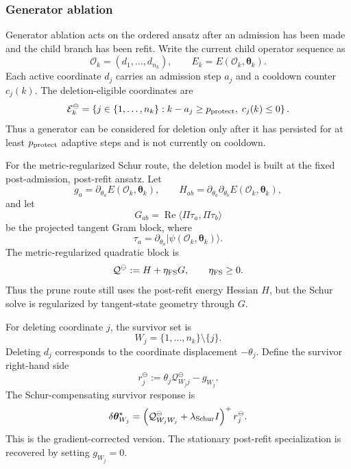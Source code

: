 \documentclass[
  reprint,
  amsmath,
  amssymb,
  aps,
  pra,
  nofootinbib,
  superscriptaddress,
  floatfix
]{revtex4-2}
\newcommand{\ket}[1]{|#1\rangle}
\begin{document}
\subsubsection{Generator ablation}
Generator ablation acts on the ordered ansatz after an admission has been made
and the child branch has been refit.  Write the current child operator sequence
as
\[
\mathcal O_k=(d_1,\ldots,d_{n_k}),
\qquad
E_k=E(\mathcal O_k,\boldsymbol\theta_k).
\]
Each active coordinate \(d_j\) carries an admission step \(a_j\) and a cooldown
counter \(c_j(k)\).  The deletion-eligible coordinates are
\begin{equation}
\mathcal E_k^\ominus
=
\left\{
j\in\{1,\ldots,n_k\}
:
k-a_j\ge p_{\rm protect},\;
c_j(k)\le 0
\right\}.
\label{eq:ablation_eligibility}
\end{equation}
Thus a generator can be considered for deletion only after it has persisted for
at least \(p_{\rm protect}\) adaptive steps and is not currently on cooldown.

For the metric-regularized Schur route, the deletion model is built at the fixed
post-admission, post-refit ansatz.  Let
\[
g_a
=
\partial_{\theta_a}E(\mathcal O_k,\boldsymbol\theta_k),
\qquad
H_{ab}
=
\partial_{\theta_a}\partial_{\theta_b}
E(\mathcal O_k,\boldsymbol\theta_k),
\]
and let
\[
G_{ab}
=
\operatorname{Re}\langle \Pi\tau_a,\Pi\tau_b\rangle
\]
be the projected tangent Gram block, where
\[
\tau_a
=
\partial_{\theta_a}\ket{\psi(\mathcal O_k,\boldsymbol\theta_k)} .
\]
The metric-regularized quadratic block is
\[
\mathcal Q^\ominus
:=
H+\eta_{\rm FS}G,
\qquad
\eta_{\rm FS}\ge 0 .
\]
Thus the prune route still uses the post-refit energy Hessian \(H\), but the
Schur solve is regularized by tangent-state geometry through \(G\).

For deleting coordinate \(j\), the survivor set is
\[
W_j=\{1,\ldots,n_k\}\setminus\{j\}.
\]
Deleting \(d_j\) corresponds to the coordinate displacement \(-\theta_j\).
Define the survivor right-hand side
\[
r_j^\ominus
:=
\theta_j\mathcal Q^\ominus_{W_jj}-g_{W_j}.
\]
The Schur-compensating survivor response is
\begin{equation}
\delta\boldsymbol\theta_{W_j}^{\star}
=
\left(
\mathcal Q^\ominus_{W_jW_j}
+\lambda_{\rm Schur} I
\right)^+
r_j^\ominus .
\label{eq:ablation_schur_response}
\end{equation}
This is the gradient-corrected version.  The stationary post-refit
specialization is recovered by setting \(g_{W_j}=0\).
\end{document}

